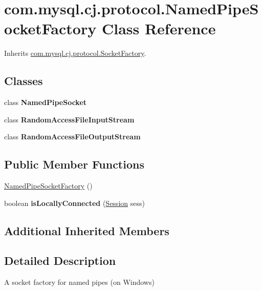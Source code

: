 \hypertarget{classcom_1_1mysql_1_1cj_1_1protocol_1_1_named_pipe_socket_factory}{}\section{com.\+mysql.\+cj.\+protocol.\+Named\+Pipe\+Socket\+Factory Class Reference}
\label{classcom_1_1mysql_1_1cj_1_1protocol_1_1_named_pipe_socket_factory}


Inherits \mbox{\hyperlink{interfacecom_1_1mysql_1_1cj_1_1protocol_1_1_socket_factory}{com.\+mysql.\+cj.\+protocol.\+Socket\+Factory}}.

\subsection*{Classes}
\begin{DoxyCompactItemize}
\item 
class {\bfseries Named\+Pipe\+Socket}
\item 
class {\bfseries Random\+Access\+File\+Input\+Stream}
\item 
class {\bfseries Random\+Access\+File\+Output\+Stream}
\end{DoxyCompactItemize}
\subsection*{Public Member Functions}
\begin{DoxyCompactItemize}
\item 
\mbox{\hyperlink{classcom_1_1mysql_1_1cj_1_1protocol_1_1_named_pipe_socket_factory_a171ec7b6055445fc5e8abda2ebaa5b63}{Named\+Pipe\+Socket\+Factory}} ()
\item 
\mbox{\label{classcom_1_1mysql_1_1cj_1_1protocol_1_1_named_pipe_socket_factory_a4b84ec480d8301d7299bfc9ef2ef58ec}} 
boolean {\bfseries is\+Locally\+Connected} (\mbox{\hyperlink{interfacecom_1_1mysql_1_1cj_1_1_session}{Session}} sess)
\end{DoxyCompactItemize}
\subsection*{Additional Inherited Members}


\subsection{Detailed Description}
A socket factory for named pipes (on Windows) 


